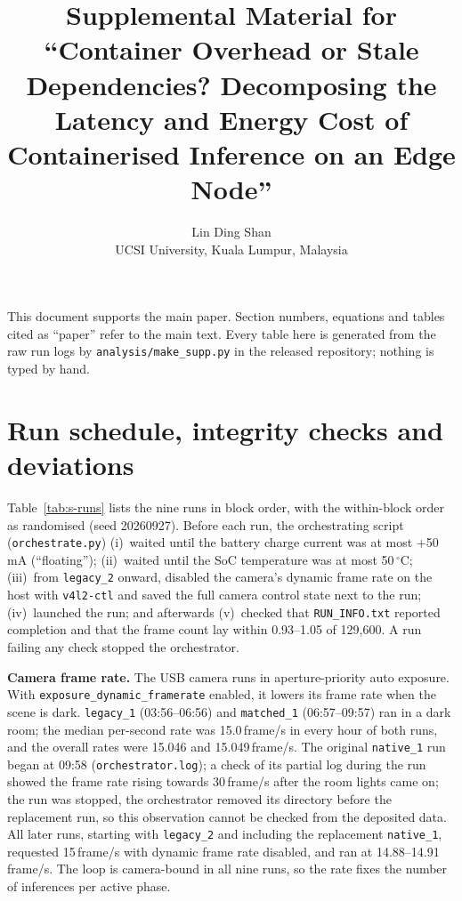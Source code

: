 \documentclass[10pt]{article}
\title{Supplemental Material for\\ ``Container Overhead or Stale Dependencies? Decomposing the Latency and Energy Cost of Containerised Inference on an Edge Node''}
\author{Lin Ding Shan\\ UCSI University, Kuala Lumpur, Malaysia}
\date{}
\begin{document}
\maketitle

This document supports the main paper. Section numbers, equations and tables cited as ``paper'' refer to the main text. Every table here is generated from the raw run logs by \texttt{analysis/make\_supp.py} in the released repository; nothing is typed by hand.

\section{Run schedule, integrity checks and deviations}

Table~\ref{tab:s-runs} lists the nine runs in block order, with the within-block order as randomised (seed 20260927). Before each run, the orchestrating script (\texttt{orchestrate.py}) (i)~waited until the battery charge current was at most +50\,mA (``floating''); (ii)~waited until the SoC temperature was at most 50\,$^\circ$C; (iii)~from \texttt{legacy\_2} onward, disabled the camera's dynamic frame rate on the host with \texttt{v4l2-ctl} and saved the full camera control state next to the run; (iv)~launched the run; and afterwards (v)~checked that \texttt{RUN\_INFO.txt} reported completion and that the frame count lay within 0.93--1.05 of 129{,}600. A run failing any check stopped the orchestrator.

\textbf{Camera frame rate.} The USB camera runs in aperture-priority auto exposure. With \texttt{exposure\_dynamic\_framerate} enabled, it lowers its frame rate when the scene is dark. \texttt{legacy\_1} (03:56--06:56) and \texttt{matched\_1} (06:57--09:57) ran in a dark room; the median per-second rate was 15.0\,frame/s in every hour of both runs, and the overall rates were 15.046 and 15.049\,frame/s. The original \texttt{native\_1} run began at 09:58 (\texttt{orchestrator.log}); a check of its partial log during the run showed the frame rate rising towards 30\,frame/s after the room lights came on; the run was stopped, the orchestrator removed its directory before the replacement run, so this observation cannot be checked from the deposited data. All later runs, starting with \texttt{legacy\_2} and including the replacement \texttt{native\_1}, requested 15\,frame/s with dynamic frame rate disabled, and ran at 14.88--14.91\,frame/s. The loop is camera-bound in all nine runs, so the rate fixes the number of inferences per active phase.
\end{document}
